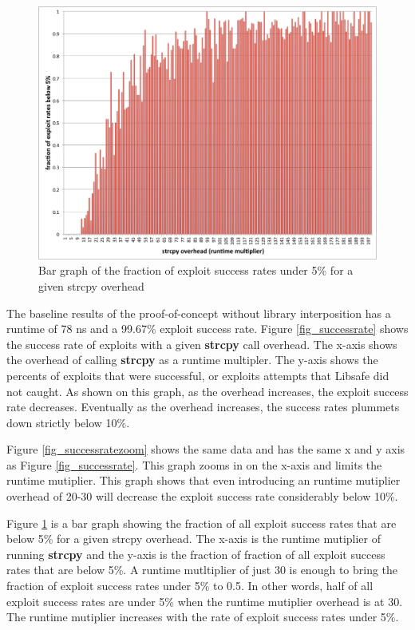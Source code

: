 \documentclass[letterpaper,twocolumn,10pt]{article}
\begin{document}
\begin{figure}
\centering
\includegraphics[width=\textwidth]{ratefraction5.pdf}
\caption{Bar graph of the fraction of exploit success rates under 5\% for a given strcpy overhead}
\label{fig_ratefraction5}
\end{figure}
The baseline results of the proof-of-concept without library interposition has a runtime of 78 ns and a 99.67\% exploit success rate. Figure \ref{fig_successrate} shows the success rate of exploits with a given \textbf{strcpy} call overhead.  The x-axis shows the overhead of calling \textbf{strcpy} as a runtime multipler.  The y-axis shows the percents of exploits that were successful, or exploits attempts that Libsafe did not caught.  As shown on this graph, as the overhead increases, the exploit success rate decreases.  Eventually as the overhead increases, the success rates plummets down strictly below 10\%.

Figure \ref{fig_successratezoom} shows the same data and has the same x and y axis as Figure \ref{fig_successrate}.  This graph zooms in on the x-axis and limits the runtime mutiplier.  This graph shows that even introducing an runtime mutiplier overhead of 20-30 will decrease the exploit success rate considerably below 10\%.

Figure \ref{fig_ratefraction5} is a bar graph showing the fraction of all exploit success rates that are below 5\% for a given strcpy overhead.  The x-axis is the runtime mutiplier of running \textbf{strcpy} and the y-axis is the fraction of fraction of all exploit success rates that are below 5\%.  A runtime mutltiplier of just 30 is enough to bring the fraction of exploit success rates under 5\% to 0.5.  In other words, half of all exploit success rates are under 5\% when the runtime mutiplier overhead is at 30.  The runtime mutiplier increases with the rate of exploit success rates under 5\%.
\end{document}
